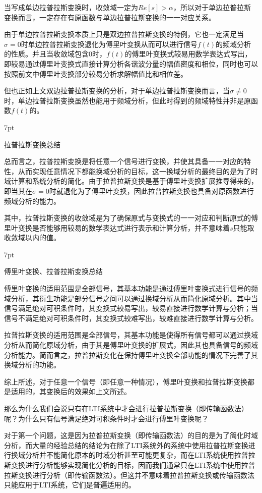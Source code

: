 \documentclass{article}
\numberwithin{equation}{section}
\numberwithin{figure}{section}
\newenvironment{formal}{%
\def\FrameCommand{%
\hspace{1pt}%
{\color{DarkBlue}\vrule width 2pt}%
{\color{formalshade}\vrule width 4pt}%
\colorbox{formalshade}%
}%
\MakeFramed{\advance\hsize-\width\FrameRestore}%
\noindent\hspace{-4.55pt}%
\begin{adjustwidth}{}{7pt}%
\vspace{2pt}\vspace{2pt}%
}
{%
\vspace{2pt}\end{adjustwidth}\endMakeFramed%
}
\begin{document}
当写成单边拉普拉斯变换时，收敛域一定为$Re[s]>\alpha$，所以对于单边拉普拉斯变换而言，一定存在有原函数与单边拉普拉斯变换的一一对应关系。

由于单边拉普拉斯变换本质上只是双边拉普拉斯变换的特例，它也一定满足当$\sigma=0$时单边拉普拉斯变换退化为傅里叶变换从而可以进行信号$f(t)$的频域分析的性质。并且当收敛域包含0时，$f(t)$的傅里叶变换式较易用数学表达式写出，即较易通过傅里叶变换式直接计算分析各谐波分量的幅值密度和相位，同时也可以按照前文中傅里叶变换部分较易分析求解幅值比和相位差。

但也正如上文双边拉普拉斯变换的分析，对于单边拉普拉斯变换而言，当$\sigma \neq 0$时，单边拉普拉斯变换虽然也能用于频域分析，但此时得到的频域特性并非是原函数$f(t)$的。

\begin{formal}
    拉普拉斯变换总结
\end{formal}
    总而言之，拉普拉斯变换是将任意一个信号进行变换，并使其具备一一对应的特性，从而实现任意情况下都能换域分析的目标，这一换域分析的最终目的是为了时域计算和系统分析的简化。由于拉普拉斯变换是基于傅里叶变换扩展推导得来的，即当其在$\sigma = 0$时就退化为了傅里叶变换，因此拉普拉斯变换也具备对原函数进行频域分析的能力。

    其中，拉普拉斯变换的收敛域是为了确保原式与变换式的一一对应和判断原式的傅里叶变换是否能够用较易的数学表达式进行表示和计算分析，并不意味着$s$只能取收敛域以内的值。

\begin{formal}
    傅里叶变换、拉普拉斯变换总结
\end{formal}

    傅里叶变换的适用范围是全部信号，其基本功能是通过傅里叶变换式进行信号的频域分析，其衍生功能是部分信号之间可以通过换域分析从而简化原域分析。其中当信号满足绝对可积条件时，其变换式较易写出，较易直接进行数学计算与分析；当信号不满足绝对可积条件时，其变换式较难写出，较难直接进行数学计算与分析。

    拉普拉斯变换的适用范围是全部信号，其基本功能是使得所有信号都可以通过换域分析从而简化原域分析，由于其是傅里叶变换的扩展式，因此其也具备信号的频域分析能力。简而言之，拉普拉斯变化在保持傅里叶变换全部功能的情况下完善了其换域分析的功能。

    综上所述，对于任意一个信号（即任意一种情况），傅里叶变换和拉普拉斯变换都是适用的，其变换后的效果如上文所述。

    那么为什么我们会说只有在LTI系统中才会进行拉普拉斯变换（即传输函数法）呢？为什么只有信号满足绝对可积条件时才会进行傅里叶变换呢？

    对于第一个问题，这是因为拉普拉斯变换（即传输函数法）的目的是为了简化时域分析，而大量的经验总结的结论为在除了LTI系统外的系统中使用拉普拉斯变换进行换域分析并不能简化原本的时域分析甚至可能更复杂，而在LTI系统使用拉普拉斯变换进行分析能够实现简化分析的目标，因而我们通常只在LTI系统中使用拉普拉斯变换进行分析（即传输函数法）。但这并不意味着拉普拉斯变换或传输函数法只能应用于LTI系统，它们是普遍适用的。
\end{document}
